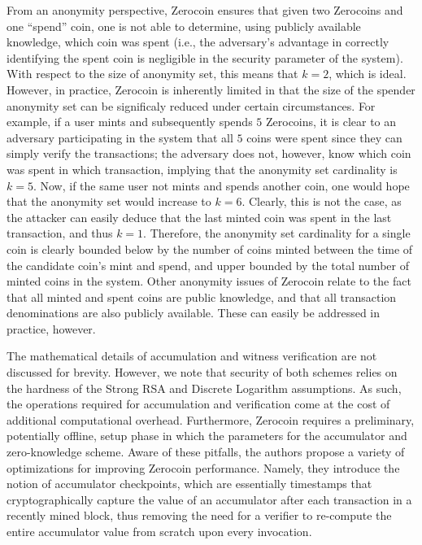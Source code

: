 From an anonymity perspective, Zerocoin ensures that given two Zerocoins and one ``spend'' coin, one is not able to determine, using publicly available knowledge, which coin was spent (i.e., the adversary's advantage in correctly identifying the spent coin is negligible in the security parameter of the system). With respect to the size of anonymity set, this means that $k = 2$, which is ideal. However, in practice, Zerocoin is inherently limited in that the size of the spender anonymity set can be significaly reduced under certain circumstances. For example, if a user mints and subsequently spends $5$ Zerocoins, it is clear to an adversary participating in the system that all $5$ coins were spent since they can simply verify the transactions; the adversary does not, however, know which coin was spent in which transaction, implying that the anonymity set cardinality is $k = 5$. Now, if the same user not mints and spends another coin, one would hope that the anonymity set would increase to $k = 6$. Clearly, this is not the case, as the attacker can easily deduce that the last minted coin was spent in the last transaction, and thus $k = 1$. Therefore, the anonymity set cardinality for a single coin is clearly bounded below by the number of coins minted between the time of the candidate coin's mint and spend, and upper bounded by the total number of minted coins in the system. Other anonymity issues of Zerocoin relate to the fact that all minted and spent coins are public knowledge, and that all transaction denominations are also publicly available. These can easily be addressed in practice, however.


The mathematical details of accumulation and witness verification are not discussed for brevity. However, we note that security of both schemes relies on the hardness of the Strong RSA and Discrete Logarithm assumptions. As such, the operations required for accumulation and verification come at the cost of additional computational overhead. Furthermore, Zerocoin requires a preliminary, potentially offline, setup phase in which the parameters for the accumulator and zero-knowledge scheme. Aware of these pitfalls, the authors propose a variety of optimizations for improving Zerocoin performance. Namely, they introduce the notion of accumulator checkpoints, which are essentially timestamps that cryptographically capture the value of an accumulator after each transaction in a recently mined block, thus removing the need for a verifier to re-compute the entire accumulator value from scratch upon every invocation. 

